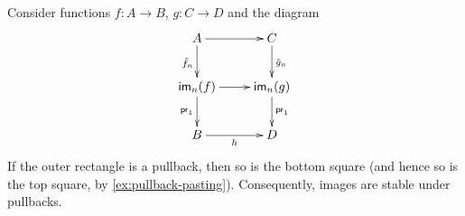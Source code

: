\documentclass[hott-all.tex]{subfiles}
\begin{document}
% 
\begin{thm}
%
Consider functions $f:A\to B$, $g:C\to D$ and the diagram
\begin{equation*}
  \vcenter{\xymatrix{
      A\ar[r]\ar[d]_{\tilde{f}_n} &
      C\ar[d]^{\tilde{g}_n}\\
      \im_n(f)\ar[r]\ar[d]_{\proj1} &
      \im_n(g)\ar[d]^{\proj1}\\
      B\ar[r]_h &
      D
      }}
\end{equation*}
If the outer rectangle is a pullback, then so is the bottom square (and hence so is the top square, by \cref{ex:pullback-pasting}). Consequently, images are stable under pullbacks.
\end{thm}
% 
% 
% 
\end{document}

